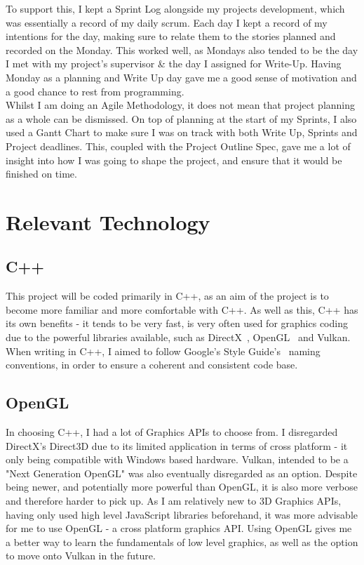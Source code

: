 \documentclass[a4paper,10pt]{report}
\begin{document}
To support this, I kept a Sprint Log alongside my projects development, which was essentially a record of my daily scrum. Each day I kept a record of my intentions for the day, making sure to relate them to the stories planned and recorded on the Monday. This worked well, as Mondays also tended to be the day I met with my project's supervisor \& the day I assigned for Write-Up. Having Monday as a planning and Write Up day gave me a good sense of motivation and a good chance to rest from programming. \\

Whilst I am doing an Agile Methodology, it does not mean that  project planning as a whole can be dismissed. On top of planning at the start of my Sprints, I also used a Gantt Chart to make sure I was on track with both Write Up, Sprints and Project deadlines. This, coupled with the Project Outline Spec, gave me a lot of insight into how I was going to shape the project, and ensure that it would be finished on time. \\

\section{Relevant Technology}

\subsection{C++}

This project will be coded primarily in C++, as an aim of the project is to become more familiar and more comfortable with C++. As well as this, C++ has its own benefits - it tends to be very fast, is very often used for graphics coding due to the powerful libraries available, such as DirectX~\cite{directx_website}, OpenGL~\cite{opengl_website} and Vulkan. When writing in C++, I aimed to follow Google's Style Guide's~\cite{google_c_style_guide} naming conventions, in order to ensure a coherent and consistent code base.

\subsection{OpenGL}
In choosing C++, I had a lot of Graphics APIs to choose from. I disregarded DirectX's Direct3D due to its limited application in terms of cross platform - it only being compatible with Windows based hardware. Vulkan, intended to be a "Next Generation OpenGL" was also eventually disregarded as an option. Despite being newer, and potentially more powerful than OpenGL, it is also more verbose and therefore harder to pick up. As I am relatively new to 3D Graphics APIs, having only used high level JavaScript libraries beforehand, it was more advisable for me to use OpenGL - a cross platform graphics API. Using OpenGL gives me a better way to learn the fundamentals of low level graphics, as well as the option to move onto Vulkan in the future.
\end{document}
